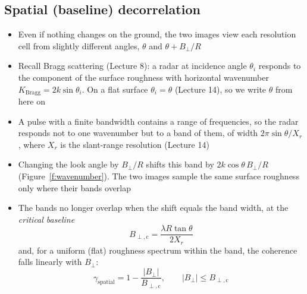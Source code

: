 \documentclass[11pt, oneside]{article}
\newcommand{\Bperp}{B_\perp}
\newcommand{\Bc}{B_{\perp,\mathrm{c}}}
\begin{document}
\subsection{Spatial (baseline) decorrelation}

\begin{itemize}
	\item Even if nothing changes on the ground, the two images view each resolution cell from slightly different angles, $\theta$ and $\theta + \Bperp/R$
	\item Recall Bragg scattering (Lecture 8): a radar at incidence angle $\theta_i$ responds to the component of the surface roughness with horizontal wavenumber $K_\mathrm{Bragg} = 2k\sin\theta_i$. On a flat surface $\theta_i = \theta$ (Lecture 14), so we write $\theta$ from here on
	\item A pulse with a finite bandwidth contains a range of frequencies, so the radar responds not to one wavenumber but to a band of them, of width $2\pi\sin\theta/X_r$, where $X_r$ is the slant-range resolution (Lecture 14)
	\item Changing the look angle by $\Bperp/R$ shifts this band by $2k\cos\theta\,\Bperp/R$ (Figure~\ref{f:wavenumber}). The two images sample the same surface roughness only where their bands overlap
	\item The bands no longer overlap when the shift equals the band width, at the \emph{critical baseline}
	\begin{equation}
		\label{e:Bc}
		\Bc = \frac{\lambda R\tan\theta}{2X_r}
	\end{equation}
	and, for a uniform (flat) roughness spectrum within the band, the coherence falls linearly with $\Bperp$:
	\begin{equation}
		\label{e:gspatial}
		\gamma_\mathrm{spatial} = 1 - \frac{|\Bperp|}{\Bc}, \qquad |\Bperp| \le \Bc
	\end{equation}

\end{itemize}
\end{document}
